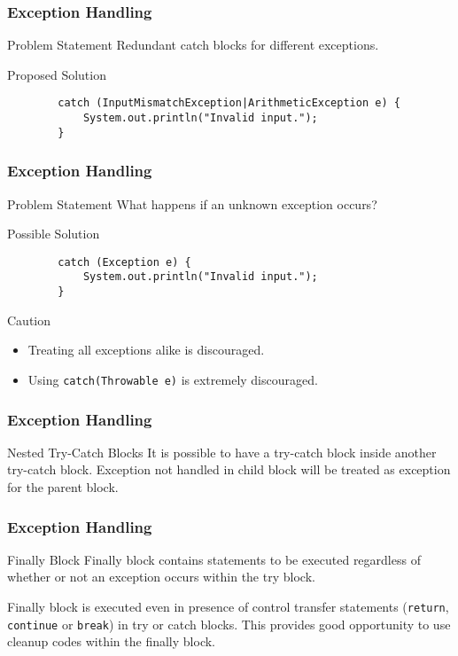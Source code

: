 \documentclass[10pt, compress]{beamer}
\begin{document}
\begin{frame}[fragile]
	\frametitle{Exception Handling}
	\begin{block}{Problem Statement}
		Redundant catch blocks for different exceptions.
	\end{block}
	\begin{block}{Proposed Solution}
		\begin{verbatim}
		catch (InputMismatchException|ArithmeticException e) {
			System.out.println("Invalid input.");
		}
		\end{verbatim}
	\end{block}
\end{frame}

\begin{frame}[fragile]
	\frametitle{Exception Handling}
	\begin{block}{Problem Statement}
		What happens if an unknown exception occurs?
	\end{block}
	\begin{block}{Possible Solution}
		\begin{verbatim}
		catch (Exception e) {
			System.out.println("Invalid input.");
		}
		\end{verbatim}
	\end{block}
	\begin{block}{Caution}
		\begin{itemize}
			\item[] Treating all exceptions alike is discouraged.
			\item[] Using \texttt{catch(Throwable e)} is \alert{extremely} discouraged.
		\end{itemize}
	\end{block}
\end{frame}

\begin{frame}[fragile]
	\frametitle{Exception Handling}
	\begin{block}{Nested Try-Catch Blocks}
		It is possible to have a try-catch block inside another try-catch block. Exception \alert{not} handled in child block will be treated as exception for the parent block.
	\end{block}
\end{frame}

\begin{frame}[fragile]
	\frametitle{Exception Handling}
	\begin{block}{Finally Block}
		Finally block contains statements to be executed \alert{regardless} of whether or not an exception occurs within the try block.

		Finally block is executed even in presence of control transfer statements (\texttt{return}, \texttt{continue} or \texttt{break}) in try or catch blocks. This provides good opportunity to use cleanup codes within the finally block.
	\end{block}
\end{frame}
\end{document}
